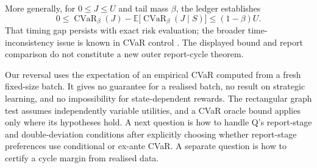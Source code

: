 \documentclass{article}
\begin{document}
More generally, for \(0\leq J\leq U\) and tail mass \(\beta\), the ledger establishes
\[
0\leq \operatorname{CVaR}_{\beta}(J)
-\mathbb{E}\bigl[\operatorname{CVaR}_{\beta}(J\mid S)\bigr]
\leq (1-\beta)U.
\]
That timing gap persists with exact risk evaluation; the broader time-inconsistency issue is known in CVaR control \cite{miller2015optimal}. The displayed bound and report comparison do not constitute a new outer report-cycle theorem. %

Our reversal uses the expectation of an empirical CVaR computed from a fresh fixed-size batch. It gives no guarantee for a realised batch, no result on strategic learning, and no impossibility for state-dependent rewards. The rectangular graph test assumes independently variable utilities, and a CVaR oracle bound applies only where its hypotheses hold. A next question is how to handle Q's report-stage and double-deviation conditions after explicitly choosing whether report-stage preferences use conditional or ex-ante CVaR. A separate question is how to certify a cycle margin from realised data. %



\end{document}
